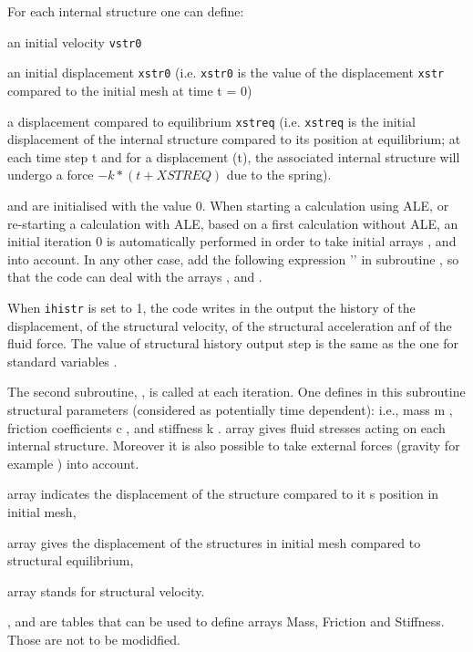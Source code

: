 {For each internal structure one can define:
\begin{list}{-}{}
 \item an initial velocity \texttt{vstr0}
 \item an initial displacement \texttt{xstr0} (i.e. \texttt{xstr0} is the value of the
 displacement \texttt{xstr} compared to the initial mesh at time t = 0)
 \item a displacement compared to equilibrium  \texttt{xstreq} (i.e. \texttt{xstreq}
 is the initial displacement of the internal structure compared to its position at
 equilibrium; at each time step t and for a displacement (t), the associated
 internal structure will undergo a force $-k*(\text{}t+XSTREQ)$ due to the spring).
\end{list}
 and  are initialised with the value 0.
When starting a calculation using ALE, or re-starting a calculation with ALE, based
 on a first calculation without ALE, an initial iteration 0 is automatically performed
 in order to take initial arrays ,  and  into
 account. In any other case, add the following expression '' in subroutine
 , so that the code can deal with the arrays ,  and .

When \texttt{ihistr} is set to 1, the code writes in the output the history of the
 displacement, of the structural velocity, of the structural acceleration anf of the
 fluid force. The value of structural history output step is the same as the one for
 standard variables .

The second subroutine, , is called at each iteration. One defines in this
 subroutine structural parameters (considered as potentially time dependent): i.e.,
 mass m , friction coefficients c , and stiffness k .
  array gives fluid stresses acting on each internal structure. Moreover it is also
 possible to take external forces (gravity for example ) into account.
\begin{list}{.}{}
 \item {} array indicates the displacement of the structure compared to it
s position in initial mesh,
 \item {} array gives the displacement of the structures in initial mesh
 compared to structural equilibrium,
 \item {} array stands for structural velocity.
\end{list}
,  and  are  tables that can be used to
 define arrays Mass, Friction and Stiffness. Those are not to be modidfied.

}

